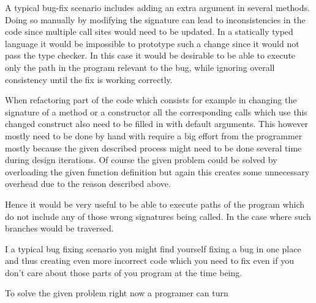   A typical bug-fix scenario includes adding an extra argument in several methods. Doing so manually by modifying the signature can lead to inconsistencies in the code since multiple call sites would need to be updated. In a statically typed language it would be impossible to prototype such a change since it would not pass the type checker. In this case it would be desirable to be able to execute only the path in the program relevant to the bug, while ignoring overall consistency until the fix is working correctly.
  
  When refactoring part of the code which consists for example in changing the signature of a method or a constructor all the corresponding calls which use this changed construct also need to be filled in with default arguments. This however mostly need to be done by hand with require a big effort from the programmer mostly because the given described process might need to be done several time during design iterations. Of course the given problem could be solved by overloading the given function definition but again this creates some unnecessary overhead due to the reason described above.

  Hence it would be very useful to be able to execute paths of the program which do not include any of those wrong signatures being called. In the case where such branches would be traversed.

  I a typical bug fixing scenario you might find yourself fixing a bug in one place and thus creating even more incorrect code which you need to fix even if you don't care about those parts of you program at the time being.

  To solve the given problem right now a programer can turn

